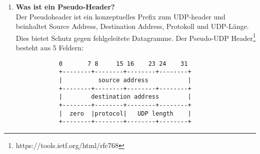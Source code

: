\documentclass[11pt]{article}
\begin{document}
\begin{enumerate}[label=\textbf{\alph*}.)]
        \textbf{Berechnung einer Checksum}\\
        Die UDP-Checksum errechnet sich aus der Summe vom Komplement von 1, dem Pseudo-UDP Header(siehe unten) und dem UDP-Datagram.\\
        $\diamond$ Source Address: 32 Bits/4 Byte\\
        $\diamond$ Destination Address: 32 Bits/4 Byte\\
        $\diamond$ 'Zero' aka Reserved: 8 Bits/1 Byte\\
        $\diamond$ Protokol: 8 Bits/1 Byte\\
        $\diamond$ UDP Length: Header+Payload Length of actual Datagram.\\

        Sollte man die Checksum nicht setzen so wird diese '0', indem man die Checksum der einfachheitshalber
        auf 0xFFFF setzt.


        \underline{Example: Calculation from Source}
        ... Man definiert IP-Addressen:
        Source Address: 152.1.51.27
        Destination Address: 152.14.94.75
        ... Die Addressen geteilt in je 16-Bit:
        0x9801, 0x331b sowie 0x980e, 0x5e4b.
        ... Diese 4 Summiert ergibt:
        0x9801 + 0x331b + 0x980e + 0x5e4b = 0x1c175
        ... Beachte dass es einen Overflow auf 16 Bit gibt, dieser bleibt zunächst.
        ... Nun addiert man die UDP-Protokollnummer, also '17'
        17 = 0x0011 + 0x1c175 = 0x1c186
        ... Zuletzt addiert man die Länge des Datagrams. Für 10 Byte wäre dies:
        10 = 0x000a + 0x1c186 = 0x1c190


        \item \textbf{Was ist ein Pseudo-Header?}\\
        Der Pseudoheader ist ein konzeptuelles Prefix zum UDP-header und beinhaltet Source Address,
        Destination Address, Protokoll und UDP-Länge. Dies bietet Schutz gegen fehlgeleitete Datagramme.
        Der Pseudo-UDP Header\footnote[1]{https://tools.ietf.org/html/rfc768} besteht aus 5 Feldern:
        \begin{verbatim}
            0       7 8     15 16    23 24    31
            +--------+--------+--------+--------+
            |          source address           |
            +--------+--------+--------+--------+
            |        destination address        |
            +--------+--------+--------+--------+
            |  zero  |protocol|   UDP length    |
            +--------+--------+--------+--------+
        \end{verbatim}


\end{enumerate}
\end{document}
